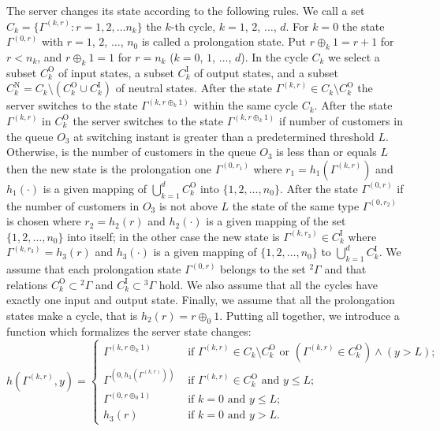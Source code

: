 \documentclass[10pt]{article}
\begin{document}
The server changes its state according to the following rules. We call a set $C_k = \{\Gamma^{(k,r)}
\colon r=1,2,\ldots n_k\}$ the $k$-th cycle, $k=1$, $2$, $\ldots$, $d$. For $k=0$ the state
$\Gamma^{(0,r)}$ with $r=1$, $2$, $\ldots$, $n_0$ is called a prolongation state. Put $r \oplus_k 1
= r+1$ for $r<n_k$, and $r \oplus_k 1 = 1$ for $r=n_k$ ($k = 0$, $1$, $\ldots$, $d$). In the cycle
$C_k$ we select a subset $C_k^{\mathrm{O}}$ of input states, a subset $C_k^{\mathrm{I}}$ of output
states, and a subset $C_k^{\mathrm{N}} = C_k \setminus (C_k^{\mathrm{O}} \cup C_k^{\mathrm{I}})$ of
neutral states.  After the state $\Gamma^{(k,r)} \in C_k\setminus C_k^{\mathrm{O}}$ the server
switches to the state $\Gamma^{(k,r \oplus_k 1)}$ within the same cycle $C_k$.  After the state
$\Gamma^{(k,r)}$ in $C_k^{\mathrm{O}}$ the server switches to the state $\Gamma^{(k,r \oplus_k 1)}$
if number of customers in the queue $O_3$ at switching instant is greater than a predetermined
threshold $L$.  Otherwise, is the number of customers in the queue $O_3$ is less than or equals $L$
then the new state is the prolongation one $\Gamma^{(0,r_1)}$ where $r_1=h_1(\Gamma^{(k,r)})$ and
$h_1(\cdot)$ is a given mapping of $\bigcup_{k=1}^d C_k^{\mathrm{O}}$ into $\{1,2,\ldots,
n_0\}$.  After the state $\Gamma^{(0,r)}$ if the number of customers in $O_3$ is not above $L$ the
state of the same type $\Gamma^{(0,r_2)}$ is chosen where $r_2=h_2(r)$ and $h_2(\cdot)$ is a given
mapping of the set $\{1,2, \ldots, n_0\}$ into itself; in the other case the new state is
$\Gamma^{(k,r_3)} \in C_k^{\mathrm{I}}$ where $\Gamma^{(k,r_3)}=h_3(r)$ and $h_3(\cdot)$ is a 
given mapping of  $\{1,2, \ldots, n_0\}$ to $\bigcup_{k=1}^d C_k^{\mathrm{I}}$. We assume
that each prolongation state $\Gamma^{(0,r)}$ belongs to the set ${}^2 \Gamma$ and that relations
$C_k^\mathrm{O}\subset {}^2 \Gamma$ and $C_k^\mathrm{I}\subset {}^3 \Gamma$ hold. We also assume
that all the cycles have exactly one input and output state. Finally, we assume that all the
prolongation states make a cycle, that is  $h_2(r)=r\oplus_0 1$. Putting all together, we introduce
a function which formalizes the server state changes:
\begin{equation}
h(\Gamma^{(k,r)},y) = 
\begin{cases}
\Gamma^{(k,r \oplus_k 1)}&  \text{ if  $\Gamma^{(k,r)}\in C_k\setminus C_k^{\mathrm{O}}$ or $(\Gamma^{(k,r)}\in C_k^{\mathrm{O}}) \wedge (y>L)$;}\\
\Gamma^{(0,h_1(\Gamma^{(k,r)}))}&  \text{ if  $\Gamma^{(k,r)}\in C_k^{\mathrm{O}}$ and $y\leqslant L$;}\\
\Gamma^{(0,r \oplus_0 1)}&  \text{ if $k=0$ and $y\leqslant L$;}\\
h_3(r)&  \text{ if  $k=0$ and $y > L$.}
\end{cases}
\label{hLaw}
\end{equation}
\end{document}
